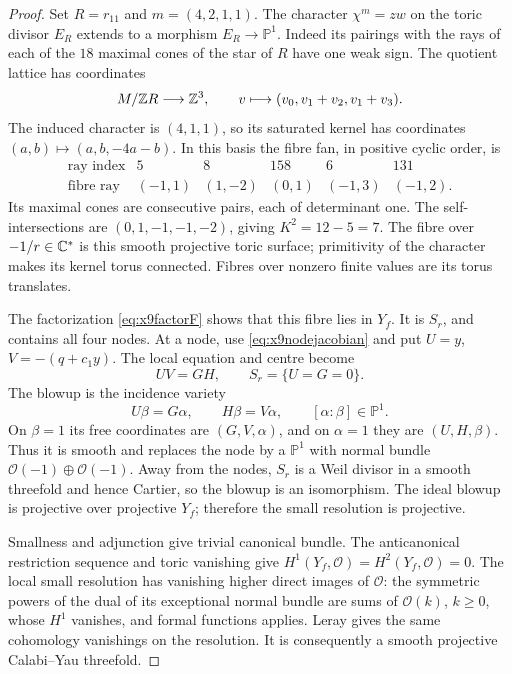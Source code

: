 \begin{proof}
Set $R=r_{11}$ and $m=(4,2,1,1)$. The character $\chi^m=zw$ on the
toric divisor $E_R$ extends to a morphism $E_R\to\mathbb P^1$.
Indeed its pairings with the rays of each of the $18$ maximal cones of
the star of $R$ have one weak sign. The quotient lattice has coordinates
\[
 M/\mathbb Z R\longrightarrow\mathbb Z^3,\qquad
 v\longmapsto(v_0,v_1+v_2,v_1+v_3).
\]
The induced character is $(4,1,1)$, so its saturated kernel has
coordinates $(a,b)\mapsto(a,b,-4a-b)$. In this basis the fibre fan,
in positive cyclic order, is
\[
\begin{array}{c|rrrrr}
\text{ray index}&5&8&158&6&131\\\hline
\text{fibre ray}&(-1,1)&(1,-2)&(0,1)&(-1,3)&(-1,2).
\end{array}
\]
Its maximal cones are consecutive pairs, each of determinant one.
The self-intersections are $(0,1,-1,-1,-2)$, giving $K^2=12-5=7$.
The fibre over $-1/r\in\mathbb C^*$ is this smooth projective toric surface;
primitivity of the character makes its kernel torus connected. Fibres
over nonzero finite values are its torus translates.

The factorization \eqref{eq:x9factorF} shows that this fibre lies in
$Y_f$. It is $S_r$, and contains all four nodes. At a node, use
\eqref{eq:x9nodejacobian} and put $U=y$, $V=-(q+c_1y)$. The local
equation and centre become
\[
 UV=GH,\qquad S_r=\{U=G=0\}.
\]
The blowup is the incidence variety
\[
 U\beta=G\alpha,\qquad H\beta=V\alpha,
                  \qquad[\alpha:\beta]\in\mathbb P^1.
\]
On $\beta=1$ its free coordinates are $(G,V,\alpha)$, and on
$\alpha=1$ they are $(U,H,\beta)$. Thus it is smooth and replaces the
node by a $\mathbb P^1$ with normal bundle
$\mathcal O(-1)\oplus\mathcal O(-1)$. Away from the nodes, $S_r$ is a
Weil divisor in a smooth threefold and hence Cartier, so the blowup is
an isomorphism. The ideal blowup is projective over projective $Y_f$;
therefore the small resolution is projective.

Smallness and adjunction give trivial canonical bundle. The
anticanonical restriction sequence and toric vanishing give
$H^1(Y_f,\mathcal O)=H^2(Y_f,\mathcal O)=0$. The local small
resolution has vanishing higher direct images of $\mathcal O$:
the symmetric powers of the dual of its exceptional normal bundle are
sums of $\mathcal O(k)$, $k\ge0$, whose $H^1$ vanishes, and formal
functions applies. Leray gives the same cohomology vanishings on the
resolution. It is consequently a smooth projective Calabi--Yau threefold.
\end{proof}

